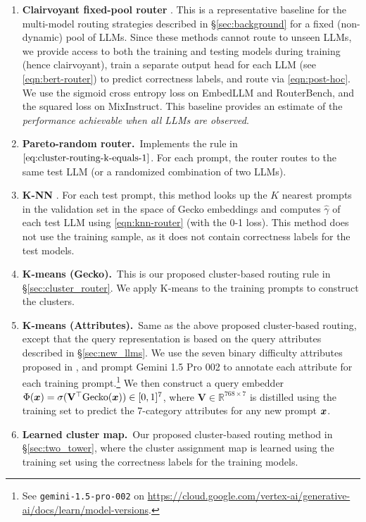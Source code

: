\begin{enumerate}[itemsep=0pt,topsep=0pt,label=(\arabic*),,leftmargin=16pt]
    \item \textbf{Clairvoyant fixed-pool router} 
    \citep{HuBieLi2024,OngAlmWu2024,Ding:2024}. 
    This is a representative baseline for the multi-model routing strategies described in \S\ref{sec:background} for a fixed (non-dynamic) pool of LLMs.
    Since these methods cannot route to unseen LLMs, we provide access to  
    both the training and testing models  during training (hence clairvoyant), train a separate output head for each LLM (see \eqref{eqn:bert-router}) to predict correctness labels, and route via \eqref{eqn:post-hoc}. We use the sigmoid cross entropy loss on EmbedLLM and RouterBench, and the squared loss on MixInstruct. This baseline provides an estimate %
     of the \emph{performance achievable when all LLMs are observed}. 
    
    \item \textbf{Pareto-random router.}\
    Implements the rule in $\eqref{eq:cluster-routing-k-equals-1}$.
    For each prompt, the router routes to the same test LLM (or a randomized combination of two LLMs). %
    
    \item \textbf{K-NN} \citep{HuBieLi2024}. For each test prompt, this method looks up the $K$ nearest prompts in the validation set in the space of Gecko embeddings and computes $\hat{\gamma}$ of each test LLM using \eqref{eqn:knn-router} (with the 0-1 loss). 
    This method does not use the training sample, 
    as it does not contain correctness labels for the test models.
    
    \item \textbf{K-means (Gecko).}\
    This is our proposed cluster-based routing rule in \S\ref{sec:cluster_router}.
    We apply K-means to the training prompts to construct the clusters.
    
    \item \textbf{K-means (Attributes).}\
    Same as the above proposed cluster-based routing, except that the query representation is based on the query attributes described in \S\ref{sec:new_llms}. 
    We use the seven binary difficulty attributes proposed in \citet{Li:2024c}, and prompt Gemini 1.5 Pro 002 to annotate each attribute for each training prompt.\footnote{See \texttt{gemini-1.5-pro-002} on \url{https://cloud.google.com/vertex-ai/generative-ai/docs/learn/model-versions}.} 
    We then construct a 
    query embedder $\Phi(\boldsymbol{x}) = \sigma(\mathbf{V}^\top \mathrm{Gecko}(\boldsymbol{x})) \in [0,1]^7$, where $\mathbf{V} \in \mathbb{R}^{768 \times 7}$ %
    is distilled using the training set to predict the 7-category attributes for any new prompt $\boldsymbol{x}$. 
    
    \item \textbf{Learned cluster map.}\ Our proposed cluster-based routing method in \S\ref{sec:two_tower}, where the cluster assignment map is learned using the training set using the correctness labels for the training models.
\end{enumerate}



